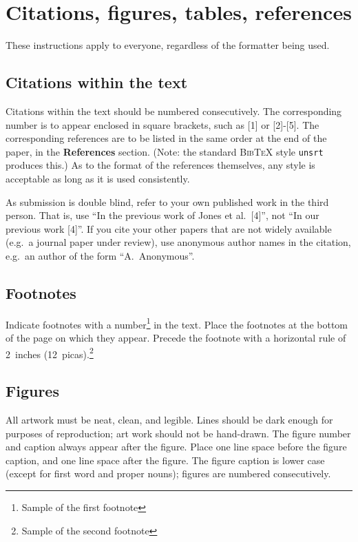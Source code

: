 \documentclass{article} %
\begin{document}
\section{Citations, figures, tables, references}
\label{others}

These instructions apply to everyone, regardless of the formatter being used.

\subsection{Citations within the text}

Citations within the text should be numbered consecutively. The corresponding
number is to appear enclosed in square brackets, such as [1] or [2]-[5]. The
corresponding references are to be listed in the same order at the end of the
paper, in the \textbf{References} section. (Note: the standard
\textsc{Bib\TeX} style \texttt{unsrt} produces this.) As to the format of the
references themselves, any style is acceptable as long as it is used
consistently.

As submission is double blind, refer to your own published work in the
third person. That is, use ``In the previous work of Jones et al.\ [4]'',
not ``In our previous work [4]''. If you cite your other papers that
are not widely available (e.g.\ a journal paper under review), use
anonymous author names in the citation, e.g.\ an author of the
form ``A.\ Anonymous''.


\subsection{Footnotes}

Indicate footnotes with a number\footnote{Sample of the first footnote} in the
text. Place the footnotes at the bottom of the page on which they appear.
Precede the footnote with a horizontal rule of 2~inches
(12~picas).\footnote{Sample of the second footnote}

\subsection{Figures}

All artwork must be neat, clean, and legible. Lines should be dark
enough for purposes of reproduction; art work should not be
hand-drawn. The figure number and caption always appear after the
figure. Place one line space before the figure caption, and one line
space after the figure. The figure caption is lower case (except for
first word and proper nouns); figures are numbered consecutively.
\end{document}
